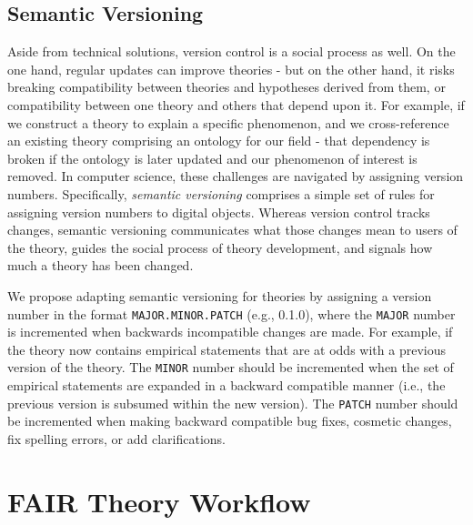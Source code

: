 \documentclass[man]{apa7}
\begin{document}
\subsection{Semantic Versioning}\label{semantic-versioning}

Aside from technical solutions, version control is a social process as well.
On the one hand, regular updates can improve theories - but on the other hand, it risks breaking compatibility between theories and hypotheses derived from them, or compatibility between one theory and others that depend upon it.
For example, if we construct a theory to explain a specific phenomenon, and we cross-reference an existing theory comprising an ontology for our field - that dependency is broken if the ontology is later updated and our phenomenon of interest is removed.
In computer science, these challenges are navigated by assigning version numbers.
Specifically, \emph{semantic versioning} comprises a simple set of rules for assigning version numbers to digital objects.
Whereas version control tracks changes,
semantic versioning communicates what those changes mean to users of the theory,
guides the social process of theory development, and signals how much a theory has been changed.

We propose adapting semantic versioning for theories by assigning a version number in the format \texttt{MAJOR.MINOR.PATCH} (e.g., 0.1.0), where the \texttt{MAJOR} number is incremented when backwards incompatible changes are made. For example, if the theory now contains empirical statements that are at odds with a previous version of the theory. The \texttt{MINOR} number should be incremented when the set of empirical statements are expanded in a backward compatible manner (i.e., the previous version is subsumed within the new version). The \texttt{PATCH} number should be incremented when making backward compatible bug fixes, cosmetic changes, fix spelling errors, or add clarifications.

\section{FAIR Theory Workflow}\label{fair-theory-workflow}
\end{document}

